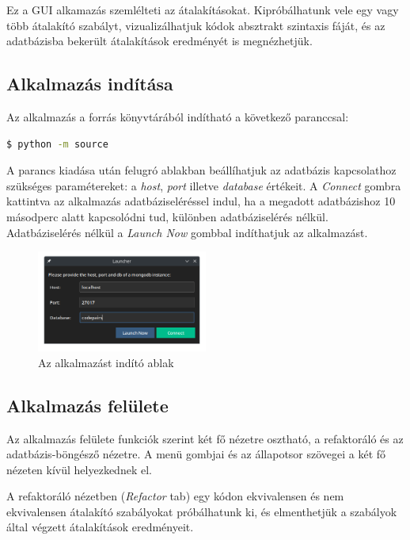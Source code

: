 Ez a GUI alkamazás szemlélteti az átalakításokat.
Kipróbálhatunk vele egy vagy több átalakító szabályt,
vizualizálhatjuk kódok absztrakt szintaxis fáját,
és az adatbázisba bekerült átalakítások eredményét is megnézhetjük.

\subsection{Alkalmazás indítása}

Az alkalmazás a forrás könyvtárából indítható a következő paranccsal:

\begin{lstlisting}[language=bash, numbers=none]
	$ python -m source
\end{lstlisting}

A parancs kiadása után felugró ablakban beállíhatjuk az adatbázis kapcsolathoz szükséges paramétereket:
a \emph{host}, \emph{port} illetve \emph{database} értékeit.
A \emph{Connect} gombra kattintva az alkalmazás adatbáziseléréssel indul,
ha a megadott adatbázishoz 10 másodperc alatt kapcsolódni tud, különben adatbáziselérés nélkül.
Adatbáziselérés nélkül a \emph{Launch Now} gombbal indíthatjuk az alkalmazást.

\begin{figure}[H]
	\centering
	\includegraphics[width=0.5\textwidth]{images/screenshots/launcher.png}
	\caption{Az alkalmazást indító ablak}
\end{figure}

\subsection{Alkalmazás felülete}

Az alkalmazás felülete funkciók szerint két fő nézetre osztható,
a refaktoráló és az adatbázis-böngésző nézetre.
A menü gombjai és az állapotsor szövegei a két fő nézeten kívül helyezkednek el.

A refaktoráló nézetben (\emph{Refactor} tab) egy kódon
ekvivalensen és nem ekvivalensen átalakító szabályokat próbálhatunk ki, és elmenthetjük
a szabályok által végzett átalakítások eredményeit.

